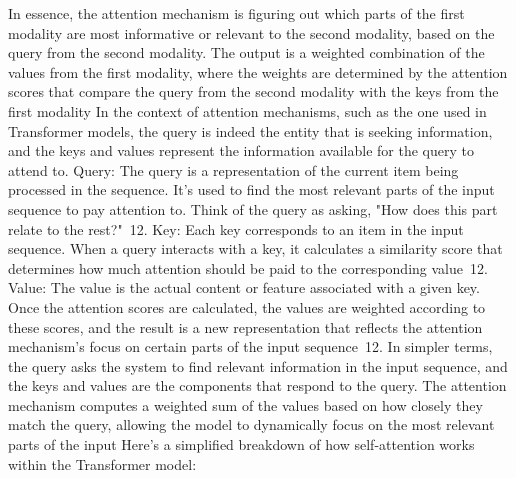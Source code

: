 \documentclass{article}%
\begin{document}
\newline%
\newline%
%
In essence, the attention mechanism is figuring out which parts of the first modality are most informative or relevant to the second modality, based on the query from the second modality. The output is a weighted combination of the values from the first modality, where the weights are determined by the attention scores that compare the query from the second modality with the keys from the first modality%
\newline%
\newline%
%
In the context of attention mechanisms, such as the one used in Transformer models, the query is indeed the entity that is seeking information, and the keys and values represent the information available for the query to attend to.%
\newline%
\newline%
%
Query: The query is a representation of the current item being processed in the sequence. It's used to find the most relevant parts of the input sequence to pay attention to. Think of the query as asking, "How does this part relate to the rest?"~12.%
\newline%
\newline%
%
Key: Each key corresponds to an item in the input sequence. When a query interacts with a key, it calculates a similarity score that determines how much attention should be paid to the corresponding value~12.%
\newline%
\newline%
%
Value: The value is the actual content or feature associated with a given key. Once the attention scores are calculated, the values are weighted according to these scores, and the result is a new representation that reflects the attention mechanism's focus on certain parts of the input sequence~12.%
\newline%
\newline%
%
In simpler terms, the query asks the system to find relevant information in the input sequence, and the keys and values are the components that respond to the query. The attention mechanism computes a weighted sum of the values based on how closely they match the query, allowing the model to dynamically focus on the most relevant parts of the input%
\newline%
\newline%
%
Here's a simplified breakdown of how self{-}attention works within the Transformer model:%
\newline%
\end{document}

